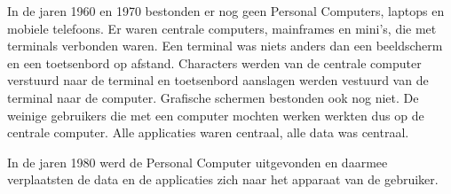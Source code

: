 In de jaren 1960 en 1970 bestonden er nog geen Personal Computers, laptops en mobiele telefoons. Er waren centrale computers, mainframes en mini's, die met terminals verbonden waren. Een terminal was niets anders dan een beeldscherm en een toetsenbord op afstand. Characters werden van de centrale computer verstuurd naar de terminal en toetsenbord aanslagen werden vestuurd van de terminal naar de computer. Grafische schermen bestonden ook nog niet. De weinige gebruikers die met een computer mochten werken werkten dus op de centrale computer. Alle applicaties waren centraal, alle data was centraal.

In de jaren 1980 werd de Personal Computer uitgevonden en daarmee verplaatsten de data en de applicaties zich naar het apparaat van de gebruiker.
